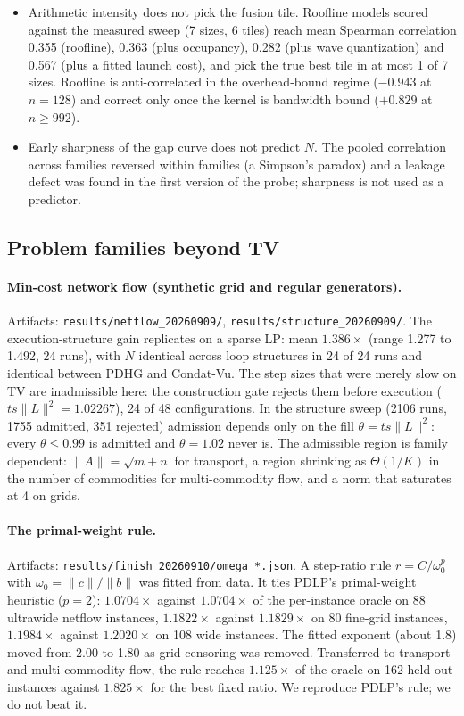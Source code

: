 \begin{itemize}
\item Arithmetic intensity does not pick the fusion tile. Roofline models
  scored against the measured sweep (7 sizes, 6 tiles) reach mean Spearman
  correlation 0.355 (roofline), 0.363 (plus occupancy), 0.282 (plus wave
  quantization) and 0.567 (plus a fitted launch cost), and pick the true best
  tile in at most 1 of 7 sizes. Roofline is anti-correlated in the
  overhead-bound regime ($-0.943$ at $n=128$) and correct only once the
  kernel is bandwidth bound ($+0.829$ at $n\ge992$).
\item Early sharpness of the gap curve does not predict $N$. The pooled
  correlation across families reversed within families (a Simpson's paradox)
  and a leakage defect was found in the first version of the probe; sharpness
  is not used as a predictor.
\end{itemize}

\subsection{Problem families beyond TV}
\label{app:log:families}

\paragraph{Min-cost network flow (synthetic grid and regular generators).}
Artifacts: \texttt{results/netflow\_20260909/}, \texttt{results/structure\_20260909/}.
The execution-structure gain replicates on a sparse LP: mean $1.386\times$
(range 1.277 to 1.492, 24 runs), with $N$ identical across loop structures
in 24 of 24 runs and identical between PDHG and Condat-Vu. The step sizes
that were merely slow on TV are inadmissible here: the construction gate
rejects them before execution ($t s \|L\|^2 = 1.02267$), 24 of 48
configurations. In the structure sweep (2106 runs, 1755 admitted, 351
rejected) admission depends only on the fill $\theta = t s \|L\|^2$: every
$\theta\le0.99$ is admitted and $\theta=1.02$ never is. The admissible
region is family dependent: $\|A\|=\sqrt{m+n}$ for transport, a region
shrinking as $\Theta(1/K)$ in the number of commodities for multi-commodity
flow, and a norm that saturates at 4 on grids.

\paragraph{The primal-weight rule.}
Artifacts: \texttt{results/finish\_20260910/omega\_*.json}. A step-ratio rule
$r = C/\omega_0^p$ with $\omega_0 = \|c\|/\|b\|$ was fitted from data. It ties
PDLP's primal-weight heuristic ($p=2$): $1.0704\times$ against $1.0704\times$
of the per-instance oracle on 88 ultrawide netflow instances, $1.1822\times$
against $1.1829\times$ on 80 fine-grid instances, $1.1984\times$ against
$1.2020\times$ on 108 wide instances. The fitted exponent (about 1.8) moved
from 2.00 to 1.80 as grid censoring was removed. Transferred to transport and
multi-commodity flow, the rule reaches $1.125\times$ of the oracle on 162
held-out instances against $1.825\times$ for the best fixed ratio. We
reproduce PDLP's rule; we do not beat it.

